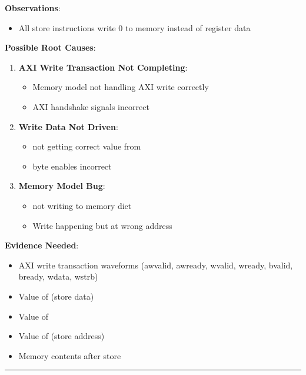 \begin{record}

\textbf{Observations}:

\begin{itemize}
\tightlist
\item
  All store instructions write 0 to memory instead of register data
\end{itemize}

\textbf{Possible Root Causes}:

\begin{enumerate}
\def\labelenumi{\arabic{enumi}.}
\item
  \textbf{AXI Write Transaction Not Completing}:

  \begin{itemize}
  \tightlist
  \item
    Memory model not handling AXI write correctly
  \item
    AXI handshake signals incorrect
  \end{itemize}
\item
  \textbf{Write Data Not Driven}:

  \begin{itemize}
  \tightlist
  \item
     not getting correct value from 
  \item
     byte enables incorrect
  \end{itemize}
\item
  \textbf{Memory Model Bug}:

  \begin{itemize}
  \tightlist
  \item
     not writing to memory
    dict
  \item
    Write happening but at wrong address
  \end{itemize}
\end{enumerate}

\textbf{Evidence Needed}:

\begin{itemize}
\tightlist
\item
  AXI write transaction waveforms (awvalid, awready, wvalid, wready,
  bvalid, bready, wdata, wstrb)
\item
  Value of  (store data)
\item
  Value of 
\item
  Value of  (store address)
\item
  Memory contents after store
\end{itemize}

\begin{center}\rule{0.5\linewidth}{0.5pt}\end{center}

\end{record}

